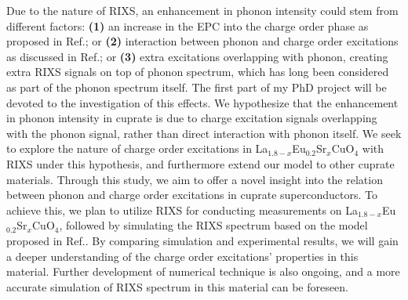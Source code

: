 \documentclass[11pt]{article}
\begin{document}
Due to the nature of RIXS, an enhancement in phonon intensity could stem from different factors: \textbf{(1)} an increase in the EPC into the charge order phase as proposed in Ref.\cite{wang_charge_2021,peng_electronic_2022}; 
or \textbf{(2)} interaction between phonon and charge order excitations as discussed in Ref.\cite{li_multiorbital_2020, chaix_dispersive_2017,huang_quantum_2021}; 
or \textbf{(3)} extra excitations overlapping with phonon, creating extra RIXS signals on top of phonon spectrum, which has long been considered as part of the phonon spectrum itself. 
The first part of my PhD project will be devoted to the investigation of this effects.
We hypothesize that the enhancement in phonon intensity in cuprate is due to charge excitation signals overlapping with the phonon signal, rather than direct interaction with phonon itself.  
We seek to explore the nature of charge order excitations in {La$_{1.8-x}$Eu$_{0.2}$Sr$_x$CuO$_{4}$} with RIXS under this hypothesis, and furthermore extend our model to other cuprate materials. 
Through this study, we aim to offer a novel insight into the relation between phonon and charge order excitations in cuprate superconductors. 
To achieve this, we plan to utilize RIXS for conducting measurements on {La$_{1.8-x}$Eu$_{0.2}$Sr$_x$CuO$_{4}$}, followed by simulating the RIXS spectrum based on the model proposed in Ref.\cite{devereaux_directly_2016}. 
By comparing simulation and experimental results, we will gain a deeper understanding of the charge order excitations' properties in this material. 
Further development of numerical technique is also ongoing, and a more accurate simulation of RIXS spectrum in this material can be foreseen.
\end{document}
